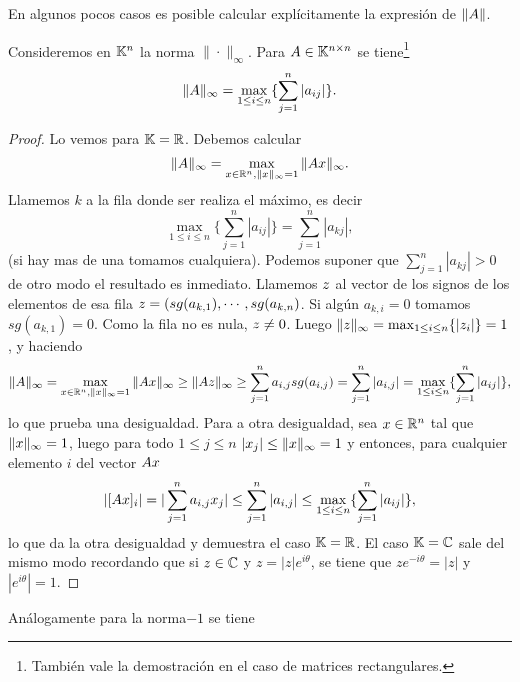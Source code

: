 En algunos pocos casos es posible calcular explícitamente la expresión de $\|\Ab\|$.

\begin{ejemplo}
Consideremos en $\mathbb K^n$ la norma $\|\cdot\|_\infty$. Para $\Ab\in \Knn$ se tiene\footnote{También vale la demostración en el caso de matrices rectangulares.}
\tcc
$$
 \|\Ab\|_\infty=\max_{1\le i\le n}\{\sum_{j=1}^{n} |a_{ij}|\}.
$$
\etcc
\begin{proof}
 Lo vemos para $\mathbb K=\mathbb R$. Debemos calcular
$$\|\Ab\|_\infty =
\max_{\xb \in \R^n, \|\xb\|_\infty = 1} \|\Ab\xb\|_\infty.
 $$
 Llamemos $k$ a la fila donde ser realiza el máximo, es decir
 $$
 \max_{1\le i\le n}\{\sum_{j=1}^{n} |a_{ij}|\}=\sum_{j=1}^{n} |a_{kj}|,
 $$
 (si hay mas de una tomamos cualquiera). Podemos suponer que
 $\sum_{j=1}^{n} |a_{kj}|>0$ de otro modo el resultado es inmediato. Llamemos $\zb$ al vector de los signos de los elementos de esa fila $\zb=(sg(a_{k,1}),\cdots ,sg(a_{k,n})$. Si algún $a_{k,i}=0$ tomamos $sg(a_{k,1})=0$. Como la fila no es nula, $\zb\neq\cero$. Luego $\|\zb\|_\infty=\max_{1\le i\le n}\{|z_i|\}=1$, y  haciendo
 $$
\|\Ab\|_\infty =\max_{\xb \in \R^n, \|\xb\|_\infty = 1} \|\Ab\xb\|_\infty
 \ge \|\Ab\zb\|_\infty\ge \sum_{j=1}^n a_{i,j}sg(a_{i,j})=\sum_{j=1}^n |a_{i,j}|=\max_{1\le i\le n}\{\sum_{j=1}^{n} |a_{ij}|\},
 $$
 lo que prueba una desigualdad. Para a otra desigualdad, sea $\xb\in \R^n$ tal que $\|\xb\|_\infty=1$, luego para todo $1\le j\le n$ $|x_j|\le \|\xb\|_\infty=1$ y entonces, para cualquier elemento $i$ del vector $\Ab\xb$
$$
|[\Ab\xb]_i|=|\sum_{j=1}^na_{i,j}x_j |\le \sum_{j=1}^n|a_{i,j}|\le \max_{1\le i\le n}\{\sum_{j=1}^{n} |a_{ij}|\},
$$
lo que da la otra desigualdad y demuestra el caso $\mathbb K=\mathbb R$.
El caso $\mathbb K=\mathbb C$ sale del mismo modo recordando que si $z\in \mathbb C$ y $z=|z|e^{i\theta}$, se tiene que $ze^{-i\theta}=|z|$ y $|e^{i\theta}|=1$.
\end{proof}
Análogamente para la norma$-1$ se tiene
\end{ejemplo}


